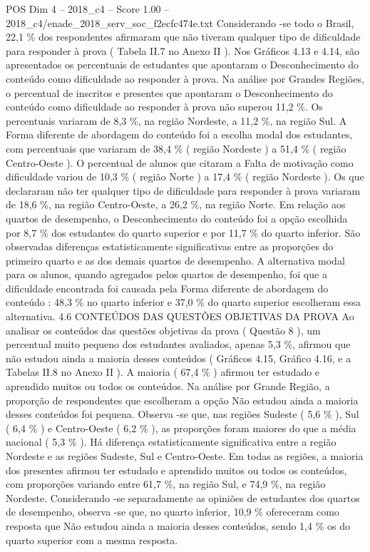 \begin{textsample}{POS Dim 4 – 2018\_c4 – Score 1.00 – 2018\_c4/enade\_2018\_serv\_soc\_f2ecfc474e.txt}
Considerando -se todo o Brasil, 22,1 \% dos respondentes afirmaram que não tiveram qualquer tipo de dificuldade para responder à prova ( Tabela II.7 no Anexo II ).
Nos Gráficos 4.13 e 4.14, são apresentados os percentuais de estudantes que apontaram o Desconhecimento do conteúdo como dificuldade ao responder à prova.
Na análise por Grandes Regiões, o percentual de inscritos e presentes que apontaram o Desconhecimento do conteúdo como dificuldade ao responder à prova não superou 11,2 \%.
Os percentuais variaram de 8,3 \%, na região Nordeste, a 11,2 \%, na região Sul.
A Forma diferente de abordagem do conteúdo foi a escolha modal dos estudantes, com percentuais que variaram de 38,4 \% ( região Nordeste ) a 51,4 \% ( região Centro-Oeste ).
O percentual de alunos que citaram a Falta de motivação como dificuldade variou de 10,3 \% ( região Norte ) a 17,4 \% ( região Nordeste ).
Os que declararam não ter qualquer tipo de dificuldade para responder à prova variaram de 18,6 \%, na região Centro-Oeste, a 26,2 \%, na região Norte.
Em relação aos quartos de desempenho, o Desconhecimento do conteúdo foi a opção escolhida por 8,7 \% dos estudantes do quarto superior e por 11,7 \% do quarto inferior.
São observadas diferenças estatisticamente significativas entre as proporções do primeiro quarto e as dos demais quartos de desempenho.
A alternativa modal para os alunos, quando agregados pelos quartos de desempenho, foi que a dificuldade encontrada foi causada pela Forma diferente de abordagem do conteúdo : 48,3 \% no quarto inferior e 37,0 \% do quarto superior escolheram essa alternativa. 4.6 CONTEÚDOS DAS QUESTÕES OBJETIVAS DA PROVA Ao analisar os conteúdos das questões objetivas da prova ( Questão 8 ), um percentual muito pequeno dos estudantes avaliados, apenas 5,3 \%, afirmou que não estudou ainda a maioria desses conteúdos ( Gráficos 4.15, Gráfico 4.16, e a Tabelas II.8 no Anexo II ).
A maioria ( 67,4 \% ) afirmou ter estudado e aprendido muitos ou todos os conteúdos.
Na análise por Grande Região, a proporção de respondentes que escolheram a opção Não estudou ainda a maioria desses conteúdos foi pequena.
Observa -se que, nas regiões Sudeste ( 5,6 \% ), Sul ( 6,4 \% ) e Centro-Oeste ( 6,2 \% ), as proporções foram maiores do que a média nacional ( 5,3 \% ).
Há diferença estatisticamente significativa entre a região Nordeste e as regiões Sudeste, Sul e Centro-Oeste.
Em todas as regiões, a maioria dos presentes afirmou ter estudado e aprendido muitos ou todos os conteúdos, com proporções variando entre 61,7 \%, na região Sul, e 74,9 \%, na região Nordeste.
Considerando -se separadamente as opiniões de estudantes dos quartos de desempenho, observa -se que, no quarto inferior, 10,9 \% ofereceram como resposta que Não estudou ainda a maioria desses conteúdos, sendo 1,4 \% os do quarto superior com a mesma resposta.

\end{textsample}
